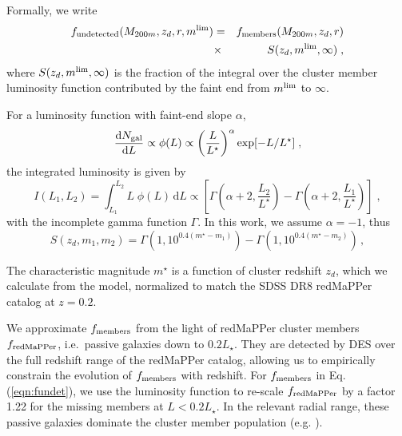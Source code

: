 {Formally, we write
\begin{eqnarray}
f_{\rm undetected}(M_{200m}, z_{d}, r, m^{\rm lim}) &=& f_{\rm members}(M_{200m}, z_{d}, r) \nonumber \\ &\times& S(z_d,m^{\rm lim},\infty) \; ,
\label{eqn:fundet}
\end{eqnarray}
where $S(z_d,m^{\rm lim},\infty)$ is the fraction of the integral over the cluster member luminosity function contributed by the faint end from $m^{\rm lim}$ to $\infty$. %

For a \citet{Schechter} luminosity function with faint-end slope $\alpha$,
\begin{equation}
\frac{\mathrm{d}N_{\rm gal}}{\mathrm{d}L}\propto\phi(L)\propto \left(\frac{L}{L^{\star}}\right)^{\alpha}\exp[-L/L^{\star}]\; ,
\end{equation}
the integrated luminosity is given by 
\begin{equation}
I(L_1,L_2)=\int_{L_1}^{L_2} L\;\phi(L)\,\mathrm{d}L \propto \left[\Gamma\left(\alpha+2,\frac{L_2}{L^{\star}}\right)-\Gamma\left(\alpha+2,\frac{L_1}{L^{\star}}\right)\right] \; ,
\end{equation}
with the incomplete gamma function $\Gamma$. In this work, we assume $\alpha=-1$, thus 
\begin{equation}
S(z_d,m_1,m_2)=\Gamma\left(1,10^{0.4(m^{\star}-m_1)}\right)-\Gamma\left(1,10^{0.4(m^{\star}-m_2)}\right)\, ,
\end{equation}

The characteristic magnitude $m^{\star}$ \citep{2007ApJ...660..221K, 2014ApJ...785..104R} is a function of cluster redshift $z_d$, which we calculate from the \citet{2003MNRAS.344.1000B} model, normalized to match the SDSS DR8 \citep{2011ApJS..193...29A} redMaPPer catalog \citep{2014ApJ...785..104R} at $z=0.2$.

We approximate $f_{\rm members}$ from the light of redMaPPer cluster members $f_{\rm redMaPPer}$, i.e.~passive galaxies down to $0.2 L_\star$. They are detected by DES over the full redshift range of the redMaPPer catalog, allowing us to empirically constrain the evolution of $f_{\rm members}$ with redshift. For $f_{\rm members}$ in Eq. (\ref{eqn:fundet}), we use the luminosity function to re-scale $f_{\rm redMaPPer}$ by a factor 1.22 for the missing members at $L<0.2 L_\star$. In the relevant radial range, these passive galaxies dominate the cluster member population (e.g. \citealt{zu2}). 

}
